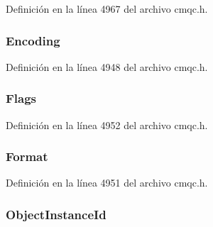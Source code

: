 Definición en la línea 4967 del archivo cmqc.\+h.

\hypertarget{structtag_m_q_r_m_h_a30167bf454a49a60fd3fe4e9e586af34}{}
\subsubsection[{Encoding}]{ Encoding}\label{structtag_m_q_r_m_h_a30167bf454a49a60fd3fe4e9e586af34}


Definición en la línea 4948 del archivo cmqc.\+h.

\hypertarget{structtag_m_q_r_m_h_a8da770267273b200fa9c968fa2a0da57}{}
\subsubsection[{Flags}]{ Flags}\label{structtag_m_q_r_m_h_a8da770267273b200fa9c968fa2a0da57}


Definición en la línea 4952 del archivo cmqc.\+h.

\hypertarget{structtag_m_q_r_m_h_a435a478822008713f8aaff89f369ed63}{}
\subsubsection[{Format}]{ Format}\label{structtag_m_q_r_m_h_a435a478822008713f8aaff89f369ed63}


Definición en la línea 4951 del archivo cmqc.\+h.

\hypertarget{structtag_m_q_r_m_h_aed96c2686cc299fc94e1042a9f0c3920}{}
\subsubsection[{Object\+Instance\+Id}]{ Object\+Instance\+Id}\label{structtag_m_q_r_m_h_aed96c2686cc299fc94e1042a9f0c3920}


